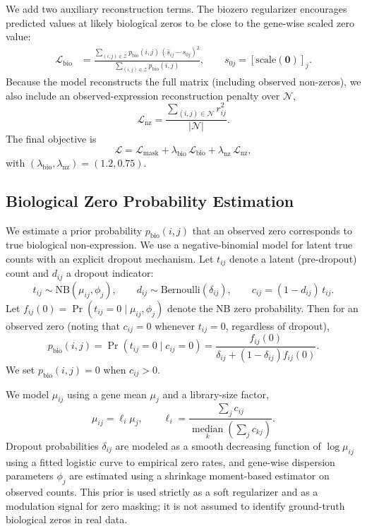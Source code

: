\documentclass{article}
\theoremstyle{plain}
\theoremstyle{definition}
\theoremstyle{remark}
\begin{document}
  We add two auxiliary reconstruction terms. The biozero regularizer encourages
  predicted values at likely biological zeros to be close to the gene-wise scaled
  zero value:
  \[
  \begin{aligned}
  \mathcal{L}_{\mathrm{bio}}
  &=\frac{\sum_{(i,j)\in\mathcal{Z}} p_{\mathrm{bio}}(i,j)\,(\hat{s}_{ij}-s_{0j})^2}
         {\sum_{(i,j)\in\mathcal{Z}} p_{\mathrm{bio}}(i,j)},\qquad
  s_{0j}=[\mathrm{scale}(\mathbf{0})]_j.
  \end{aligned}
  \]
  Because the model reconstructs the full matrix (including observed non-zeros),
  we also include an observed-expression reconstruction penalty over $\mathcal{N}$,
  \[
  \mathcal{L}_{\mathrm{nz}}=
  \frac{\sum_{(i,j)\in\mathcal{N}} r_{ij}^2}{|\mathcal{N}|}.
  \]
  The final objective is
  \[
  \mathcal{L}=\mathcal{L}_{\mathrm{mask}}+\lambda_{\mathrm{bio}}\,\mathcal{L}_{\mathrm{bio}}
  +\lambda_{\mathrm{nz}}\,\mathcal{L}_{\mathrm{nz}},
  \]
  with $(\lambda_{\mathrm{bio}},\lambda_{\mathrm{nz}})=(1.2,0.75)$.

\subsection{Biological Zero Probability Estimation}
  \label{sec:biozero}
  We estimate a prior probability $p_{\mathrm{bio}}(i,j)$ that an observed zero
  corresponds to true biological non-expression. We use a negative-binomial
  model for latent true counts with an explicit dropout mechanism. Let $t_{ij}$
  denote a latent (pre-dropout) count and $d_{ij}$ a dropout indicator:
  \[
  t_{ij} \sim \mathrm{NB}(\mu_{ij},\phi_j),\qquad
  d_{ij} \sim \mathrm{Bernoulli}(\delta_{ij}),\qquad
  c_{ij} = (1-d_{ij})\,t_{ij}.
  \]
  Let $f_{ij}(0)=\Pr(t_{ij}=0\mid \mu_{ij},\phi_j)$ denote the NB zero probability.
  Then for an observed zero (noting that $c_{ij}=0$ whenever $t_{ij}=0$,
  regardless of dropout),
  \[
  p_{\mathrm{bio}}(i,j)=\Pr(t_{ij}=0\mid c_{ij}=0)
  =\frac{f_{ij}(0)}{\delta_{ij}+(1-\delta_{ij})f_{ij}(0)}.
  \]
  We set $p_{\mathrm{bio}}(i,j)=0$ when $c_{ij}>0$.

  We model $\mu_{ij}$ using a gene mean $\mu_j$ and a library-size factor,
  \[
  \mu_{ij}=\ell_i\mu_j,\qquad
  \ell_i=\frac{\sum_j c_{ij}}{\operatorname*{median}_k\left(\sum_j c_{kj}\right)}.
  \]
  Dropout probabilities $\delta_{ij}$ are modeled as a smooth decreasing function
  of $\log \mu_{ij}$ using a fitted logistic curve to empirical zero rates, and
  gene-wise dispersion parameters $\phi_j$ are estimated using a shrinkage
  moment-based estimator on observed counts. This prior is used strictly as a
  soft regularizer and as a modulation signal for zero masking; it is not assumed
  to identify ground-truth biological zeros in real data.
\end{document}
